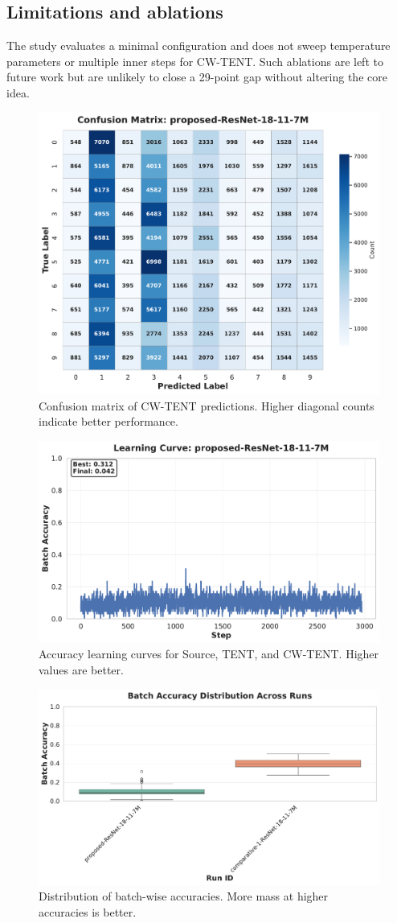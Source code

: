\documentclass{article} %
\begin{document}
\subsection{Limitations and ablations}
The study evaluates a minimal configuration and does not sweep temperature parameters or multiple inner steps for CW-TENT. Such ablations are left to future work but are unlikely to close a 29-point gap without altering the core idea.

\begin{figure}[H]
  \centering
  \includegraphics[width=0.7\linewidth]{ images/confusion_matrix.pdf }
  \caption{Confusion matrix of CW-TENT predictions. Higher diagonal counts indicate better performance.}
\end{figure}

\begin{figure}[H]
  \centering
  \includegraphics[width=0.7\linewidth]{ images/learning_curve.pdf }
  \caption{Accuracy learning curves for Source, TENT, and CW-TENT. Higher values are better.}
\end{figure}

\begin{figure}[H]
  \centering
  \includegraphics[width=0.7\linewidth]{ images/batch_acc_distribution.pdf }
  \caption{Distribution of batch-wise accuracies. More mass at higher accuracies is better.}
\end{figure}
\end{document}
